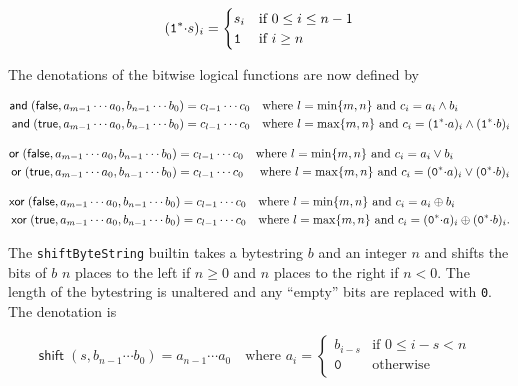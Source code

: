$$
(\mathtt{1}^*{\cdot}s)_i =
\begin{cases}
  s_i & \text{if $0 \leq i \leq n-1$}\\
  \mathtt{1} & \text{if $i \geq n$}
\end{cases}
$$

\noindent The denotations of the bitwise logical functions are now defined by

\begin{align*}
\mathsf{and}\;(\mathsf{false}, a_{m-1} \cdots a_0, b_{n-1} \cdots b_0) &= c_{l-1} \cdots c_0 
\quad \text{where $l=\min\{m,n\}$ and $c_i = a_i \wedge b_i$}\\
\mathsf{and}\;(\mathsf{true}, a_{m-1} \cdots a_0, b_{n-1} \cdots b_0) &= c_{l-1} \cdots c_0
\quad \text{where $l=\max\{m,n\}$ and $c_i = (\mathtt{1}^*{\cdot}a)_i \wedge(\mathtt{1}^*{\cdot}b)_i$}
\end{align*}


\begin{align*}
\mathsf{or}\;(\mathsf{false}, a_{m-1} \cdots a_0, b_{n-1} \cdots b_0) &= c_{l-1} \cdots c_0
  \quad \text{where $l=\min\{m,n\}$ and $c_i = a_i \vee b_i$}\\
\mathsf{or}\;(\mathsf{true}, a_{m-1} \cdots a_0, b_{n-1} \cdots b_0) &= c_{l-1} \cdots c_0 
\quad \text{ where $l=\max\{m,n\}$ and $c_i = (\mathtt{0}^*{\cdot}a)_i \vee (\mathtt{0}^*{\cdot}b)_i$}
\end{align*}


\begin{align*}
\mathsf{xor}\;(\mathsf{false}, a_{m-1} \cdots a_0, b_{n-1} \cdots b_0) &= c_{l-1} \cdots c_0 
\quad \text{where $l=\min\{m,n\}$ and $c_i = a_i \oplus b_i$}\\
\mathsf{xor}\;(\mathsf{true}, a_{m-1} \cdots a_0, b_{n-1} \cdots b_0) &= c_{l-1} \cdots c_0 
\quad \text{where $l=\max\{m,n\}$ and $c_i = (\mathtt{0}^*{\cdot}a)_i \oplus (\mathtt{0}^*{\cdot}b)_i$.}
\end{align*}


\label{note:shift}

The \texttt{shiftByteString} builtin takes a bytestring $b$ and an integer $n$ and
shifts the bits of $b$ $n$ places to the left if $n \geq 0$ and $n$ places to
the right if $n < 0$.  The length of the bytestring is unaltered and any
``empty'' bits are replaced with \texttt{0}. The denotation is 

$$
\mathsf{shift}\;(s,b_{n-1} \cdots b_0) =
  a_{n-1} \cdots a_0 \quad \text{where }
  a_i = \begin{cases}
     b_ {i-s} & \text{if $0 \leq i-s < n$ }\\
     \texttt{0} & \text{otherwise}\\
\end{cases}
$$

